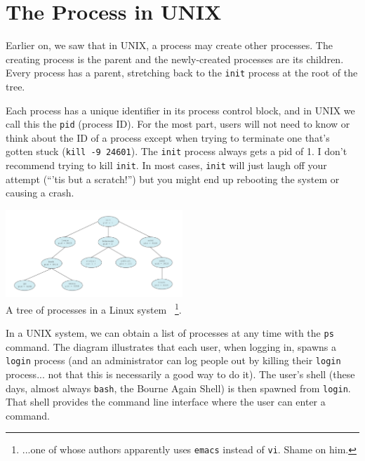




\section*{The Process in UNIX}

Earlier on, we saw that in UNIX, a process may create other processes. The creating process is the parent and the newly-created processes are its children. Every process has a parent, stretching back to the \texttt{init} process at the root of the tree.

Each process has a unique identifier in its process control block, and in UNIX we call this the \texttt{pid} (process ID). For the most part, users will not need to know or think about the ID of a process except when trying to terminate one that's gotten stuck (\texttt{kill -9 24601}). The \texttt{init} process always gets a pid of 1. I don't recommend trying to kill \texttt{init}. In most cases, \texttt{init} will just laugh off your attempt (``'tis but a scratch!'') but you might end up rebooting the system or causing a crash.

\begin{center}
\includegraphics[width=0.5\textwidth]{images/linux-process-tree.png}\\
A tree of processes in a Linux system~\cite{osc} \footnote{...one of whose authors apparently uses \texttt{emacs} instead of \texttt{vi}. Shame on him.}.
\end{center}

In a UNIX system, we can obtain a list of processes at any time with the \texttt{ps} command. The diagram illustrates that each user, when logging in, spawns a \texttt{login} process (and an administrator can log people out by killing their \texttt{login} process... not that this is necessarily a good way to do it). The user's shell (these days, almost always \texttt{bash}, the Bourne Again Shell) is then spawned from \texttt{login}. That shell provides the command line interface where the user can enter a command.

